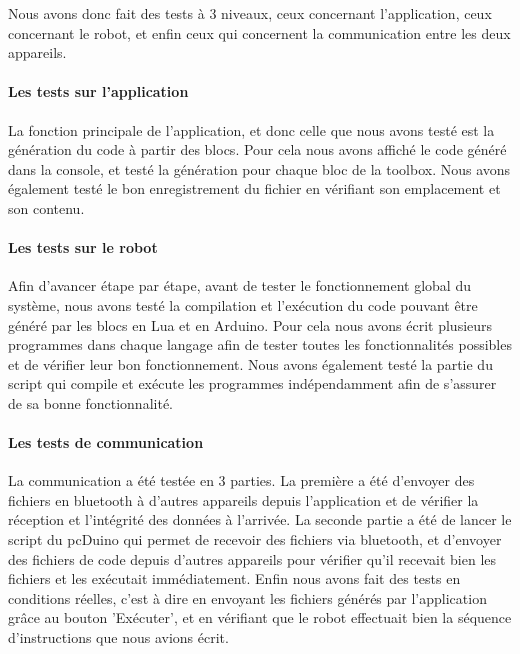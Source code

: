 \documentclass[12pt,francais]{report}
\begin{document}
Nous avons donc fait des tests à 3 niveaux, ceux concernant l'application, ceux concernant le robot, et enfin ceux qui concernent la communication entre les deux appareils.

\paragraph*{Les tests sur l'application\\}

La fonction principale de l'application, et donc celle que nous avons testé est la génération du code à partir des blocs. Pour cela nous avons affiché le code généré dans la console, et testé la génération pour chaque bloc de la toolbox. Nous avons également testé le bon enregistrement du fichier en vérifiant son emplacement et son contenu.

\paragraph*{Les tests sur le robot\\}

Afin d'avancer étape par étape, avant de tester le fonctionnement global du système, nous avons testé la compilation et l'exécution du code pouvant être généré par les blocs en Lua et en Arduino. Pour cela nous avons écrit plusieurs programmes dans chaque langage afin de tester toutes les fonctionnalités possibles et de vérifier leur bon fonctionnement.
Nous avons également testé la partie du script qui compile et exécute les programmes indépendamment afin de s'assurer de sa bonne fonctionnalité.

\paragraph*{Les tests de communication\\}

La communication a été testée en 3 parties. La première a été d'envoyer des fichiers en bluetooth à d'autres appareils depuis l'application et de vérifier la réception et l'intégrité des données à l'arrivée. La seconde partie a été de lancer le script du pcDuino qui permet de recevoir des fichiers via bluetooth, et d'envoyer des fichiers de code depuis d'autres appareils pour vérifier qu'il recevait bien les fichiers et les exécutait immédiatement. Enfin nous avons fait des tests en conditions réelles, c'est à dire en envoyant les fichiers générés par l'application grâce au bouton 'Exécuter', et en vérifiant que le robot effectuait bien la séquence d'instructions que nous avions écrit.
\end{document}
